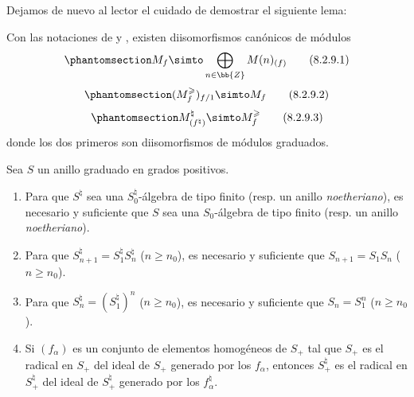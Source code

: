 \documentclass[oneside,10pt]{amsart}
\renewcommand{\geq}{\geqslant}
\let\EGAOriginalLabel\label
\renewcommand{\label}[1]{\phantomsection\EGAOriginalLabel{#1}}
\begin{document}
Dejamos de nuevo al lector el cuidado de demostrar el siguiente lema:
\begin{lemma}[8.2.9]
\label{II.8.2.9}
Con las notaciones de  y , existen diisomorfismos canónicos de módulos
\[
\label{II.8.2.9.1}
  M_f \simto \bigoplus_{n\in\bb{Z}} M(n)_{(f)}
\tag{8.2.9.1}
\]
\[
\label{II.8.2.9.2}
  (M_f^\geq)_{f/1} \simto M_f
\tag{8.2.9.2}
\]
\[
\label{II.8.2.9.3}
  M_{(f^\natural)}^\natural \simto M_f^\geq
\tag{8.2.9.3}
\]
donde los dos primeros son diisomorfismos de módulos graduados.
\end{lemma}

\begin{lemma}[8.2.10]
\label{II.8.2.10}
Sea $S$ un anillo graduado en grados positivos.
\begin{enumerate}
  \item[\rm{(i)}] Para que $S^\natural$ sea una $S_0^\natural$-álgebra de tipo finito \textup{(resp. un anillo \emph{noetheriano})}, es necesario y suficiente que $S$ sea una $S_0$-álgebra de tipo finito \textup{(resp. un anillo \emph{noetheriano})}.
  \item[\rm{(ii)}] Para que $S_{n+1}^\natural = S_1^\natural S_n^\natural$ ($n\geq n_0$), es necesario y suficiente que $S_{n+1}=S_1S_n$ ($n\geq n_0$).
  \item[\rm{(iii)}] Para que $S_n^\natural = (S_1^\natural)^n$ ($n\geq n_0$), es necesario y suficiente que $S_n=S_1^n$ ($n\geq n_0$).
  \item[\rm{(iv)}] Si $(f_\alpha)$ es un conjunto de elementos homogéneos de $S_+$ tal que $S_+$ es el radical en $S_+$ del ideal de $S_+$ generado por los $f_\alpha$, entonces $S_+^\natural$ es el radical en $S_+^\natural$ del ideal de $S_+^\natural$ generado por los $f_\alpha^\natural$.
\end{enumerate}
\end{lemma}
\end{document}
